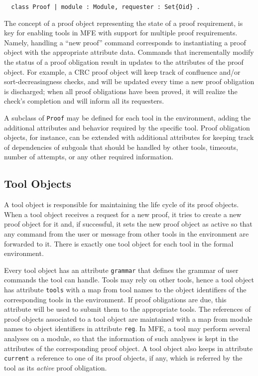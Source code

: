 \begin{small}
\begin{verbatim}
  class Proof | module : Module, requester : Set{Oid} .
\end{verbatim}
\end{small}
%
The concept of a proof object representing the state of
a proof requirement, is key for enabling tools 
in MFE with support for 
multiple proof requirements. Namely, handling a ``new
proof'' command corresponds to instantiating a proof object
with the appropriate attribute data. 
Commands that incrementally modify the status of a proof
obligation result in updates to the attributes of the proof
object.
For example, a CRC proof object will keep track of confluence and/or 
sort-decreasingness checks, and will be updated every time a new proof 
obligation is discharged; when all proof obligations have been proved, 
it will realize the check's completion and will inform all its requesters. 

A subclass of \texttt{Proof} may be defined
for each tool in the environment, adding the additional attributes and 
behavior required by the specific tool.  
Proof obligation objects, for instance, can be extended with
additional attributes for keeping track of dependencies
of subgoals that should be handled by other tools, timeouts, number of attempts, 
or any other required information.

\subsection{Tool Objects}

A tool object is responsible for maintaining the life cycle of
its proof objects. When a tool object receives a request for a new proof,
it tries to create a new proof object for it and, if successful, 
it sets the new proof object
as active so that any command from the user or message from other 
tools in the environment are forwarded to it. 
There is exactly one tool object
for each tool in the formal environment. 

Every tool object
has an attribute \texttt{grammar} that defines the grammar of user commands
the tool can handle.
Tools may rely on other tools, hence a tool object has
attribute \texttt{tools} with a map from tool names to the object identifiers of the corresponding tools in the environment. If proof obligations are due, this attribute will be used to submit them to the appropriate tools. 
The references of proof objects associated to a tool object are
maintained with a map from module names to object identifiers in attribute \texttt{reg}.
In MFE, a tool may perform several analyses on a module, so
that the information of such analyses is kept in the
attributes of the corresponding proof object.
A tool object also keeps in attribute \texttt{current} 
a reference to one of its proof
objects, if any, which is referred by the tool as its {\em active}
proof obligation.

